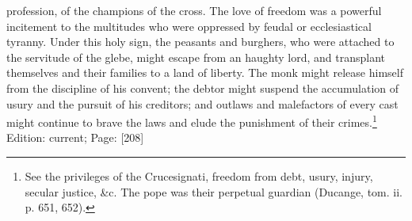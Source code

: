profession, of the champions of the cross. The love of freedom was a powerful incitement to the multitudes who were oppressed by feudal or ecclesiastical tyranny. Under this holy sign, the peasants and burghers, who were attached to the servitude of the glebe, might escape from an haughty lord, and transplant themselves and their families to a land of liberty. The monk might release himself from the discipline of his convent; the debtor might suspend the accumulation of usury and the pursuit of his creditors; and outlaws and malefactors of every cast might continue to brave the laws and elude the punishment of their crimes.\footnote{See the privileges of the Crucesignati, freedom from debt, usury, injury, secular justice, \&c. The pope was their perpetual guardian (Ducange, tom. ii. p. 651, 652).}
Edition: current; Page: [208]

